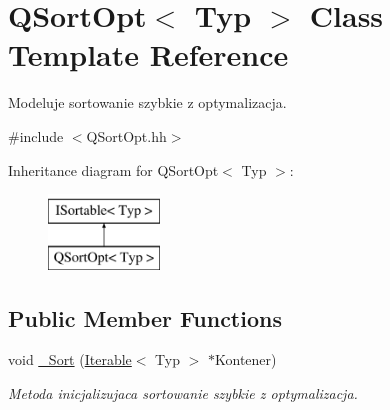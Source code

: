 \hypertarget{class_q_sort_opt}{\section{Q\-Sort\-Opt$<$ Typ $>$ Class Template Reference}
\label{class_q_sort_opt}
}


Modeluje sortowanie szybkie z optymalizacja.  




{\ttfamily \#include $<$Q\-Sort\-Opt.\-hh$>$}

Inheritance diagram for Q\-Sort\-Opt$<$ Typ $>$\-:\begin{figure}[H]
\begin{center}
\leavevmode
\includegraphics[height=2.000000cm]{class_q_sort_opt}
\end{center}
\end{figure}
\subsection*{Public Member Functions}
\begin{DoxyCompactItemize}
\item 
void \hyperlink{class_q_sort_opt_af9283edf949f7631c4f08f4b945370fa}{\-\_\-\-Sort} (\hyperlink{class_iterable}{Iterable}$<$ Typ $>$ $\ast$Kontener)
\begin{DoxyCompactList}\small\item\em Metoda inicjalizujaca sortowanie szybkie z optymalizacja. \end{DoxyCompactList}\end{DoxyCompactItemize}
